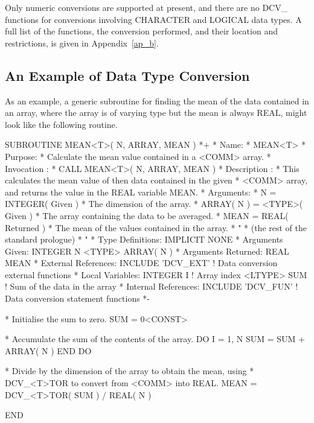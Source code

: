 \documentclass[twoside,11pt,nolof]{starlink}
\providecommand{\latexelsehtml}[2]{#1}
\begin{document}
Only numeric conversions are supported at present, and
there are no DCV\_ functions for conversions involving CHARACTER and
LOGICAL data types.
A full list of the functions, the conversion performed, and their
location and restrictions, is given in
\latexelsehtml{Appendix~\ref{ap_b}}{the
\htmlref{conversion functions}{ap_b}}.

\subsection{An Example of Data Type Conversion}

As an example, a generic subroutine for finding the mean of the data
contained in an array, where the array is of varying type but the mean is
always REAL, might look like the following routine.

\begin{terminalv}
          SUBROUTINE MEAN<T>( N, ARRAY, MEAN )
    *+
    *  Name:
    *     MEAN<T>
    *  Purpose:
    *     Calculate the mean value contained in a <COMM> array.
    *  Invocation :
    *     CALL MEAN<T>( N, ARRAY, MEAN )
    *  Description :
    *     This calculates the mean value of then data contained in the given
    *     <COMM> array, and returns the value in the REAL variable MEAN.
    *  Arguments:
    *     N = INTEGER( Given )
    *        The dimension of the array.
    *     ARRAY( N ) = <TYPE>( Given )
    *        The array containing the data to be averaged.
    *     MEAN = REAL( Returned )
    *        The mean of the values contained in the array.
    *                   "
    *     (the rest of the standard prologue)
    *                   "
    *  Type Definitions:
          IMPLICIT NONE
    *  Arguments Given:
          INTEGER N
          <TYPE> ARRAY( N )
    *  Arguments Returned:
          REAL MEAN
    *  External References:
          INCLUDE 'DCV_EXT'          ! Data conversion external functions
    *  Local Variables:
          INTEGER I                  ! Array index
          <LTYPE> SUM                ! Sum of the data in the array
    *  Internal References:
          INCLUDE 'DCV_FUN'          ! Data conversion statement functions
    *-

    *  Initialise the sum to zero.
          SUM = 0<CONST>

    *  Accumulate the sum of the contents of the array.
          DO I = 1, N
            SUM = SUM + ARRAY( N )
          END DO

    *  Divide by the dimension of the array to obtain the mean, using
    *  DCV_<T>TOR to convert from <COMM> into REAL.
          MEAN = DCV_<T>TOR( SUM ) / REAL( N )

          END
\end{terminalv}
\end{document}
